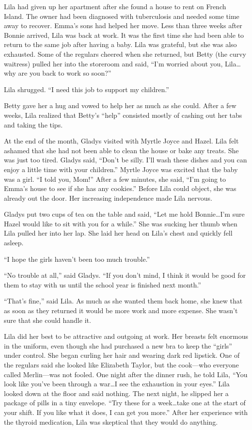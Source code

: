 \documentclass[
  letterpaper,
]{book}
\begin{document}
Lila had given up her apartment after she found a house to rent on
French Island. The owner had been diagnosed with tuberculosis and needed
some time away to recover. Emma's sons had helped her move. Less than
three weeks after Bonnie arrived, Lila was back at work. It was the
first time she had been able to return to the same job after having a
baby. Lila was grateful, but she was also exhausted. Some of the
regulars cheered when she returned, but Betty (the curvy waitress)
pulled her into the storeroom and said, ``I'm worried about you,
Lila\ldots why are you back to work so soon?''

Lila shrugged. ``I need this job to support my children.''

Betty gave her a hug and vowed to help her as much as she could. After a
few weeks, Lila realized that Betty's ``help'' consisted mostly of
cashing out her tabs and taking the tips.

At the end of the month, Gladys visited with Myrtle Joyce and Hazel.
Lila felt ashamed that she had not been able to clean the house or bake
any treats. She was just too tired. Gladys said, ``Don't be silly. I'll
wash these dishes and you can enjoy a little time with your children.''
Myrtle Joyce was excited that the baby was a girl. ``I told you, Mom!''
After a few minutes, she said, ``I'm going to Emma's house to see if she
has any cookies.'' Before Lila could object, she was already out the
door. Her increasing independence made Lila nervous.

Gladys put two cups of tea on the table and said, ``Let me hold
Bonnie\ldots I'm sure Hazel would like to sit with you for a while.''
She was sucking her thumb when Lila pulled her into her lap. She laid
her head on Lila's chest and quickly fell asleep.

``I hope the girls haven't been too much trouble.''

``No trouble at all,'' said Gladys. ``If you don't mind, I think it
would be good for them to stay with us until the school year is finished
next month.''

``That's fine,'' said Lila. As much as she wanted them back home, she
knew that as soon as they returned it would be more work and more
expense. She wasn't sure that she could handle it.

Lila did her best to be attractive and outgoing at work. Her breasts
felt enormous in the uniform, even though she had purchased a new bra to
keep the ``girls'' under control. She began curling her hair and wearing
dark red lipstick. One of the regulars said she looked like Elizabeth
Taylor, but the cook---who everyone called Merlin---was not fooled. One
night after the dinner rush, he told Lila, ``You look like you've been
through a war\ldots I see the exhaustion in your eyes.'' Lila looked
down at the floor and said nothing. The next night, he slipped her a
package of pills in a tiny envelope. ``Try these for a week\ldots take
one at the start of your shift. If you like what it does, I can get you
more.'' After her experience with the thyroid medication, Lila was
skeptical that they would do anything.
\end{document}
